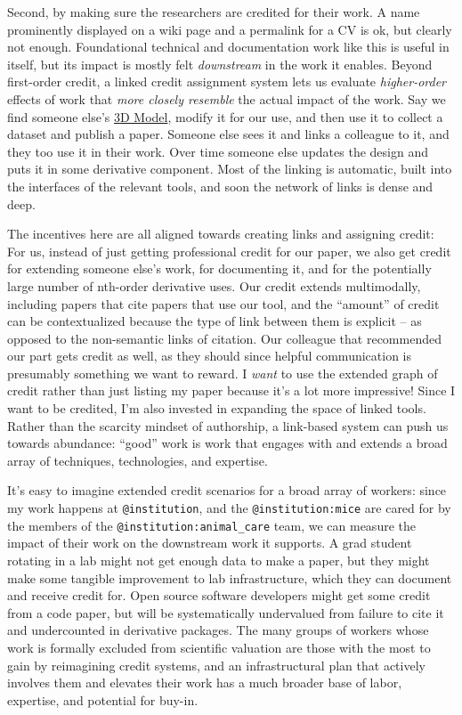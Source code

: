 \documentclass[10pt]{article}
\begin{document}
\begin{multicols}{2}
Second, by making sure the researchers are credited for their work. A
name prominently displayed on a wiki page and a permalink for a CV is
ok, but clearly not enough. Foundational technical and documentation
work like this is useful in itself, but its impact is mostly felt
\emph{downstream} in the work it enables. Beyond first-order credit, a
linked credit assignment system lets us evaluate \emph{higher-order}
effects of work that \emph{more closely resemble} the actual impact of
the work. Say we find someone else's
\href{https://wiki.auto-pi-lot.com/index.php/3D_CAD}{3D Model}, modify
it for our use, and then use it to collect a dataset and publish a
paper. Someone else sees it and links a colleague to it, and they too
use it in their work. Over time someone else updates the design and puts
it in some derivative component. Most of the linking is automatic, built
into the interfaces of the relevant tools, and soon the network of links
is dense and deep.

The incentives here are all aligned towards creating links and assigning
credit: For us, instead of just getting professional credit for our
paper, we also get credit for extending someone else's work, for
documenting it, and for the potentially large number of nth-order
derivative uses. Our credit extends multimodally, including papers that
cite papers that use our tool, and the ``amount'' of credit can be
contextualized because the type of link between them is explicit -- as
opposed to the non-semantic links of citation. Our colleague that
recommended our part gets credit as well, as they should since helpful
communication is presumably something we want to reward. I \emph{want}
to use the extended graph of credit rather than just listing my paper
because it's a lot more impressive! Since I want to be credited, I'm
also invested in expanding the space of linked tools. Rather than the
scarcity mindset of authorship, a link-based system can push us towards
abundance: ``good'' work is work that engages with and extends a broad
array of techniques, technologies, and expertise.

It's easy to imagine extended credit scenarios for a broad array of
workers: since my work happens at \texttt{@institution}, and the
\texttt{@institution:mice} are cared for by the members of the
\texttt{@institution:animal\_care} team, we can measure the impact of
their work on the downstream work it supports. A grad student rotating
in a lab might not get enough data to make a paper, but they might make
some tangible improvement to lab infrastructure, which they can document
and receive credit for. Open source software developers might get some
credit from a code paper, but will be systematically undervalued from
failure to cite it and undercounted in derivative packages. The many
groups of workers whose work is formally excluded from scientific
valuation are those with the most to gain by reimagining credit systems,
and an infrastructural plan that actively involves them and elevates
their work has a much broader base of labor, expertise, and potential
for buy-in.


\end{multicols}
\end{document}
